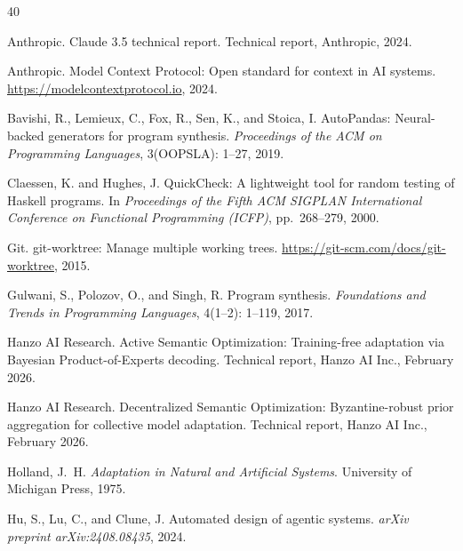 
\begin{thebibliography}{40}

Anthropic.
\newblock Claude 3.5 technical report.
\newblock Technical report, Anthropic, 2024.

Anthropic.
\newblock Model Context Protocol: Open standard for context in AI systems.
\newblock \url{https://modelcontextprotocol.io}, 2024.

Bavishi, R., Lemieux, C., Fox, R., Sen, K., and Stoica, I.
\newblock AutoPandas: Neural-backed generators for program synthesis.
\newblock \textit{Proceedings of the ACM on Programming Languages}, 3(OOPSLA):
  1--27, 2019.

Claessen, K. and Hughes, J.
\newblock QuickCheck: A lightweight tool for random testing of Haskell programs.
\newblock In \textit{Proceedings of the Fifth ACM SIGPLAN International
  Conference on Functional Programming (ICFP)}, pp.\ 268--279, 2000.

Git.
\newblock git-worktree: Manage multiple working trees.
\newblock \url{https://git-scm.com/docs/git-worktree}, 2015.

Gulwani, S., Polozov, O., and Singh, R.
\newblock Program synthesis.
\newblock \textit{Foundations and Trends in Programming Languages}, 4(1--2):
  1--119, 2017.

Hanzo AI Research.
\newblock Active Semantic Optimization: Training-free adaptation via Bayesian
  Product-of-Experts decoding.
\newblock Technical report, Hanzo AI Inc., February 2026.

Hanzo AI Research.
\newblock Decentralized Semantic Optimization: Byzantine-robust prior
  aggregation for collective model adaptation.
\newblock Technical report, Hanzo AI Inc., February 2026.

Holland, J.~H.
\newblock \textit{Adaptation in Natural and Artificial Systems}.
\newblock University of Michigan Press, 1975.

Hu, S., Lu, C., and Clune, J.
\newblock Automated design of agentic systems.
\newblock \textit{arXiv preprint arXiv:2408.08435}, 2024.


\end{thebibliography}
